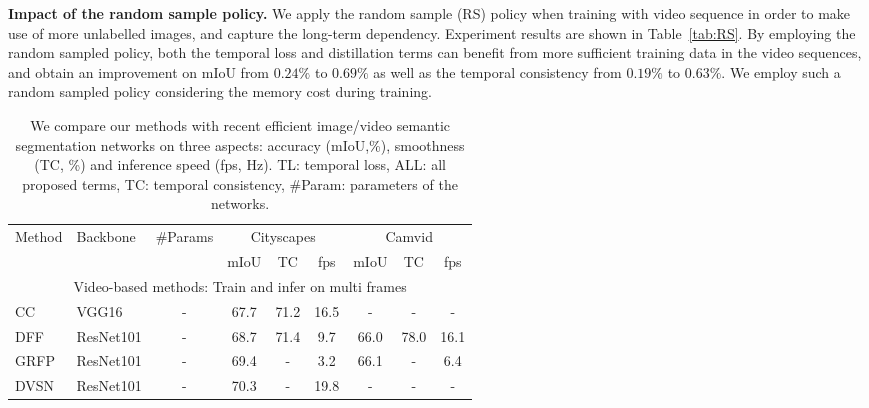 \documentclass[runningheads]{llncs}
\begin{document}
\noindent\textbf{Impact of the random sample policy.}
We apply the random sample (RS) policy when training with video sequence in order to make use of more unlabelled images, and capture the long-term dependency. Experiment results are shown in Table~\ref{tab:RS}. By employing the random sampled policy, both the temporal loss and distillation terms can benefit from more sufficient training data in the video sequences, and obtain an improvement on mIoU from $0.24\%$ to $0.69\%$ as well as the temporal consistency from $0.19\%$ to $0.63\%$. We employ such a random sampled policy considering the memory cost during training.
\begin{table}[h]
\setlength{\abovecaptionskip}{6pt}
    \setlength{\tabcolsep}{3.2pt}
\caption{We compare our methods with recent efficient image/video semantic segmentation networks on three aspects: accuracy (mIoU,\%), smoothness (TC, \%) and inference speed (fps, Hz). TL: temporal loss, ALL: all proposed terms, TC: temporal consistency, \#Param: parameters of the networks.}
\centering

\begin{tabular}{l|l|c|c|c|c|c|c|c}
\toprule

\multirow{2}{*}{Method} & \multirow{2}{*}{Backbone} & \multirow{2}{*}{\#Params} & \multicolumn{3}{c|}{Cityscapes} & \multicolumn{3}{c}{Camvid} \\\cline{4-9}
\multicolumn{1}{c|}{}                        &                           &                         & mIoU     & TC       & fps    & mIoU    & TC     & fps   \\\hline
             \multicolumn{9}{c}{Video-based methods: Train and infer on multi frames}      \\\hline


  CC~\cite{shelhamer2016clockwork}                                          & VGG16                   & -                       & 67.7     & 71.2     & 16.5     & -       & -      & -       \\
                   DFF~\cite{zhu2017deep}                                         & ResNet101                   & -                       & 68.7     & 71.4    & 9.7     & 66.0   & 78.0   & 16.1    \\
                                     GRFP~\cite{nilsson2018semantic}                                        &ResNet101                   & -                       & 69.4     & -        & 3.2     & 66.1    & -      & 6.4    \\
                   DVSN~\cite{xu2018dynamic}                                         & ResNet101                     & -                       & 70.3     & -        & 19.8     & -       & -      & -       \\


\end{tabular}
\end{table}
\end{document}
